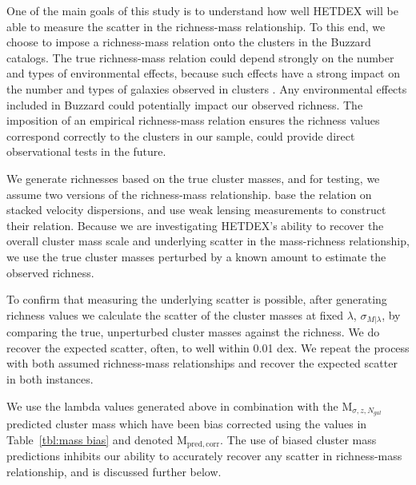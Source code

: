 \documentclass[fleqn,usenatbib]{mnras}
\begin{document}
One of the main goals of this study is to understand how well HETDEX will be able to measure the scatter in the richness-mass relationship. To this end, we choose to impose a richness-mass relation onto the clusters in the Buzzard catalogs. The true richness-mass relation could depend strongly on the number and types of environmental effects, because such effects have a strong impact on the number and types of galaxies observed in clusters . Any environmental effects included in Buzzard could potentially impact our observed richness. The imposition of an empirical richness-mass relation ensures the richness values correspond correctly to the clusters in our sample, could provide direct observational tests in the future.

We generate richnesses based on the true cluster masses, and for testing, we assume two versions of the richness-mass relationship. \cite{Farahi2016} base the relation on stacked velocity dispersions, and \cite{Simet2016} use weak lensing measurements to construct their relation. Because we are investigating HETDEX's ability to recover the overall cluster mass scale and underlying scatter in the mass-richness relationship, we use the true cluster masses perturbed by a known amount to estimate the observed richness. 

To confirm that measuring the underlying scatter is possible, after generating richness values we calculate the scatter of the cluster masses at fixed $\lambda$, $\sigma_{M|\lambda}$, by comparing the true, unperturbed cluster masses against the richness. We do recover the expected scatter, often, to well within 0.01 dex. We repeat the process with both assumed richness-mass relationships and recover the expected scatter in both instances. 

We use the lambda values generated above in combination with the $\mathrm{M}_{\sigma,z,N_{gal}}$ predicted cluster mass which have been bias corrected using the values in Table~\ref{tbl:mass bias} and denoted $\mathrm{M_{pred,corr}}$. The use of biased cluster mass predictions inhibits our ability to accurately recover any scatter in richness-mass relationship, and is discussed further below. 
\end{document}
